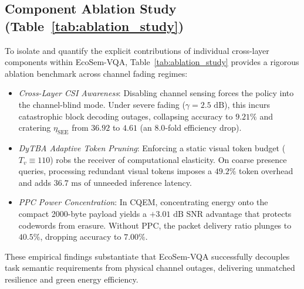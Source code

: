 \subsection{Component Ablation Study (Table~\ref{tab:ablation_study})}
To isolate and quantify the explicit contributions of individual cross-layer components within EcoSem-VQA, Table~\ref{tab:ablation_study} provides a rigorous ablation benchmark across channel fading regimes:
\begin{itemize}
    \item \textit{Cross-Layer CSI Awareness}: Disabling channel sensing forces the policy into the channel-blind mode. Under severe fading ($\gamma = 2.5\text{ dB}$), this incurs catastrophic block decoding outages, collapsing accuracy to $9.21\%$ and cratering $\eta_{\mathrm{SEE}}$ from $36.92$ to $4.61$ (an $8.0$-fold efficiency drop).
    \item \textit{DyTBA Adaptive Token Pruning}: Enforcing a static visual token budget ($T_v \equiv 110$) robs the receiver of computational elasticity. On coarse presence queries, processing redundant visual tokens imposes a $49.2\%$ token overhead and adds $36.7\text{ ms}$ of unneeded inference latency.
    \item \textit{PPC Power Concentration}: In CQEM, concentrating energy onto the compact 2000-byte payload yields a $+3.01\text{ dB}$ SNR advantage that protects codewords from erasure. Without PPC, the packet delivery ratio plunges to $40.5\%$, dropping accuracy to $7.00\%$.
\end{itemize}
These empirical findings substantiate that EcoSem-VQA successfully decouples task semantic requirements from physical channel outages, delivering unmatched resilience and green energy efficiency.

